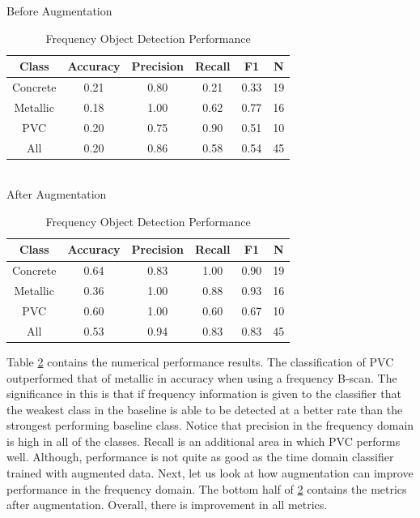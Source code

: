 \begin{table}[H]
\begin{center}
    Before Augmentation \\
    \begin{tabular}{ |c|c|c|c|c|c|}
        \hline
        Class & Accuracy & Precision & Recall & F1 & N \\
        \hline
        Concrete & 0.21 & 0.80 & 0.21 & 0.33 & 19\\ 
        Metallic & 0.18 & 1.00 & 0.62 & 0.77 & 16\\  
        PVC      & 0.20 & 0.75 & 0.90 & 0.51 & 10\\
        \hline
        All      & 0.20 & 0.86 & 0.58 & 0.54 & 45\\
        \hline
    \end{tabular}\\
    After Augmentation\\
    \begin{tabular}{ |c|c|c|c|c|c|}
        \hline
        Class & Accuracy & Precision & Recall & F1 & N \\
        \hline
        Concrete & 0.64 & 0.83 & 1.00 & 0.90 & 19\\ 
        Metallic & 0.36 & 1.00 & 0.88 & 0.93 & 16\\  
        PVC      & 0.60 & 1.00 & 0.60 & 0.67 & 10\\
        \hline
        All      & 0.53 & 0.94 & 0.83 & 0.83 & 45\\
        \hline
    \end{tabular}
\end{center}
\caption{Frequency Object Detection Performance}
\label{table:freq_table}
\end{table}

Table \ref{table:freq_table} contains the numerical performance results. The classification of PVC outperformed that of metallic in accuracy when using a frequency B-scan. The significance in this is that if frequency information is given to the classifier that the weakest class in the baseline is able to be detected at a better rate than the strongest performing baseline class. Notice that precision in the frequency domain is high in all of the classes. Recall is an additional area in which PVC performs well. Although, performance is not quite as good as the time domain classifier trained with augmented data. Next, let us look at how augmentation can improve performance in the frequency domain. The bottom half of \ref{table:freq_table} contains the metrics after augmentation. Overall, there is improvement in all metrics. 

